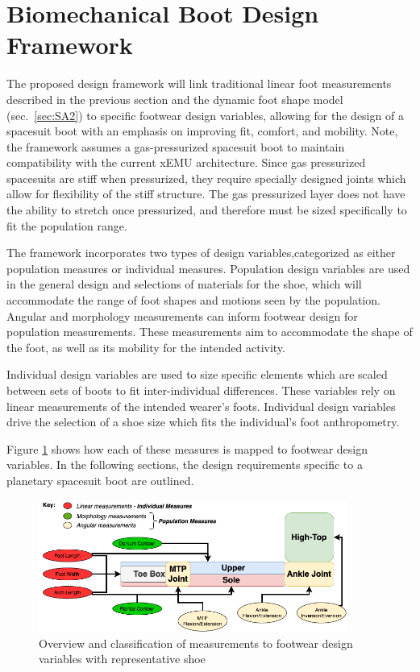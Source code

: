 \documentclass[defaultstyle,11pt]{thesis}
\begin{document}
\hypertarget{biomechanical-boot-design-framework}{%
\section{Biomechanical Boot Design Framework}\label{biomechanical-boot-design-framework}}

The proposed design framework will link traditional linear foot measurements described in the previous section and the dynamic foot shape model (sec.~\ref{sec:SA2}) to specific footwear design variables, allowing for the design of a spacesuit boot with an emphasis on improving fit, comfort, and mobility.
Note, the framework assumes a gas-pressurized spacesuit boot to maintain compatibility with the current xEMU architecture.
Since gas pressurized spacesuits are stiff when pressurized, they require specially designed joints which allow for flexibility of the stiff structure.
The gas pressurized layer does not have the ability to stretch once pressurized, and therefore must be sized specifically to fit the population range.

The framework incorporates two types of design variables,categorized as either population measures or individual measures.
Population design variables are used in the general design and selections of materials for the shoe, which will accommodate the range of foot shapes and motions seen by the population.
Angular and morphology measurements can inform footwear design for population measurements.
These measurements aim to accommodate the shape of the foot, as well as its mobility for the intended activity.

Individual design variables are used to size specific elements which are scaled between sets of boots to fit inter-individual differences.
These variables rely on linear measurements of the intended wearer's foots.
Individual design variables drive the selection of a shoe size which fits the individual's foot anthropometry.

Figure \ref{fig:SA3-Overview} shows how each of these measures is mapped to footwear design variables.
In the following sections, the design requirements specific to a planetary spacesuit boot are outlined.

\begin{figure}
\hypertarget{fig:SA3-Overview}{%
\centering
\includegraphics[width=0.9\textwidth,height=\textheight]{../fig/SA3/Overview.png}
\caption{Overview and classification of measurements to footwear design variables with representative shoe}\label{fig:SA3-Overview}
}
\end{figure}
\end{document}
